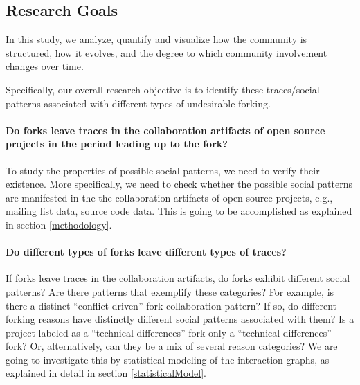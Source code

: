 \documentclass[12pt]{report}
\begin{document}


\subsection{Research Goals}

In this study, we analyze, quantify and visualize how the community is structured, how it evolves, and the degree to which community involvement changes over time. 

Specifically, our overall research objective is to identify these traces/social patterns associated with different types of undesirable forking. 

\paragraph*{\hspace{4 mm} Do forks leave traces in the collaboration artifacts of open source projects in the period leading up to the fork?\\}

To study the properties of possible social patterns, we need to verify their existence. More specifically, we need to check whether the possible social patterns are manifested in the the collaboration artifacts of open source projects, e.g., mailing list data, source code data. This is going to be accomplished as explained in section \ref{methodology}.

\paragraph*{\hspace{4 mm} Do different types of forks leave different types of traces?\\}

If forks leave traces in the collaboration artifacts, do forks exhibit different social patterns? Are there patterns that exemplify these categories? For example, is there a distinct ``conflict-driven'' fork collaboration pattern? If so, do different forking reasons have distinctly different social patterns associated with them? Is a project labeled as a ``technical differences'' fork only a ``technical differences'' fork? Or, alternatively, can they be a mix of several reason categories? We are going to investigate this by statistical modeling of the interaction graphs, as explained in detail in section \ref{statisticalModel}.
\end{document}
